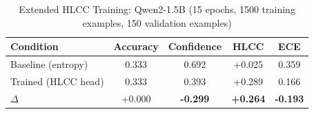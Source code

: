 \begin{table}[h]
\centering
\caption{Extended HLCC Training: Qwen2-1.5B (15 epochs, 1500 training examples, 150 validation examples)}
\begin{tabular}{lcccc}
\toprule
Condition & Accuracy & Confidence & HLCC & ECE \\
\midrule
Baseline (entropy) & 0.333 & 0.692 & +0.025 & 0.359 \\
Trained (HLCC head) & 0.333 & 0.393 & +0.289 & 0.166 \\
\midrule
$\Delta$ & +0.000 & \textbf{-0.299} & \textbf{+0.264} & \textbf{-0.193} \\
\bottomrule
\end{tabular}
\label{tab:extended_qwen}
\end{table}
